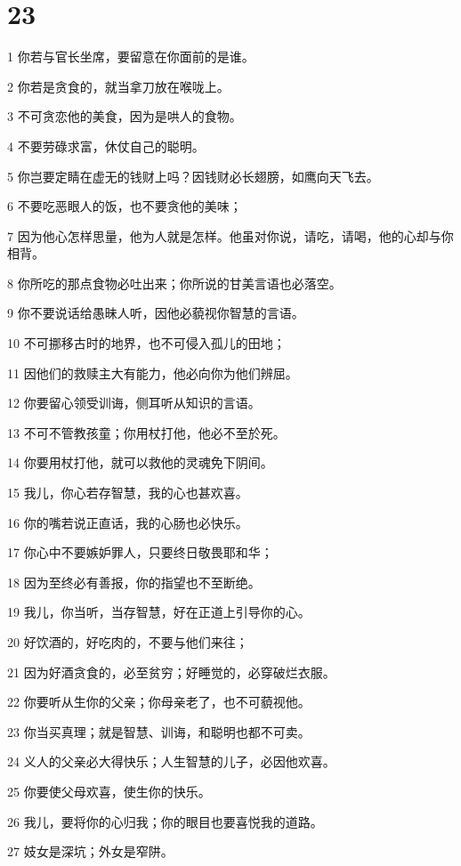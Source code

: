 \chapter{23}

\par 1 你若与官长坐席，要留意在你面前的是谁。
\par 2 你若是贪食的，就当拿刀放在喉咙上。
\par 3 不可贪恋他的美食，因为是哄人的食物。
\par 4 不要劳碌求富，休仗自己的聪明。
\par 5 你岂要定睛在虚无的钱财上吗？因钱财必长翅膀，如鹰向天飞去。
\par 6 不要吃恶眼人的饭，也不要贪他的美味；
\par 7 因为他心怎样思量，他为人就是怎样。他虽对你说，请吃，请喝，他的心却与你相背。
\par 8 你所吃的那点食物必吐出来；你所说的甘美言语也必落空。
\par 9 你不要说话给愚昧人听，因他必藐视你智慧的言语。
\par 10 不可挪移古时的地界，也不可侵入孤儿的田地；
\par 11 因他们的救赎主大有能力，他必向你为他们辨屈。
\par 12 你要留心领受训诲，侧耳听从知识的言语。
\par 13 不可不管教孩童；你用杖打他，他必不至於死。
\par 14 你要用杖打他，就可以救他的灵魂免下阴间。
\par 15 我儿，你心若存智慧，我的心也甚欢喜。
\par 16 你的嘴若说正直话，我的心肠也必快乐。
\par 17 你心中不要嫉妒罪人，只要终日敬畏耶和华；
\par 18 因为至终必有善报，你的指望也不至断绝。
\par 19 我儿，你当听，当存智慧，好在正道上引导你的心。
\par 20 好饮酒的，好吃肉的，不要与他们来往；
\par 21 因为好酒贪食的，必至贫穷；好睡觉的，必穿破烂衣服。
\par 22 你要听从生你的父亲；你母亲老了，也不可藐视他。
\par 23 你当买真理；就是智慧、训诲，和聪明也都不可卖。
\par 24 义人的父亲必大得快乐；人生智慧的儿子，必因他欢喜。
\par 25 你要使父母欢喜，使生你的快乐。
\par 26 我儿，要将你的心归我；你的眼目也要喜悦我的道路。
\par 27 妓女是深坑；外女是窄阱。
